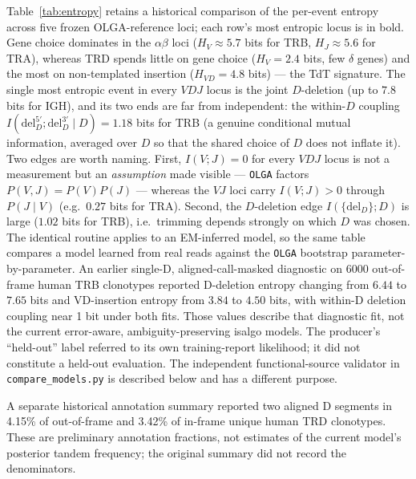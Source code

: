 \documentclass[11pt]{article}
\theoremstyle{oldplain}
\theoremstyle{oldrem}
\newcommand{\del}{\mathrm{del}}
\begin{document}
Table~\ref{tab:entropy} retains a historical comparison of the per-event entropy across five frozen OLGA-reference loci; each row's most entropic
locus is in bold. Gene choice dominates in the $\alpha\beta$ loci ($H_V\!\approx\!5.7$
bits for TRB, $H_J\!\approx\!5.6$ for TRA), whereas TRD spends little on gene choice ($H_V\!=\!2.4$ bits,
few $\delta$ genes) and the most on non-templated insertion ($H_{VD}\!=\!4.8$ bits) --- the TdT signature.
The single most entropic event in every $VDJ$ locus is the joint $D$-deletion (up to $7.8$ bits for IGH),
and its two ends are far from independent: the within-$D$ coupling $I(\del_D^{5'};\del_D^{3'}\!\mid\!D)=1.18$
bits for TRB (a genuine conditional mutual information, averaged over $D$ so that the shared choice of $D$
does not inflate it). Two edges are worth naming. First, $I(V;J)=0$ for every $VDJ$ locus is not a
measurement but an \emph{assumption} made visible --- \texttt{OLGA} factors $P(V,J)=P(V)P(J)$ --- whereas
the $VJ$ loci carry $I(V;J)>0$ through $P(J\mid V)$ (e.g.\ $0.27$ bits for TRA). Second, the $D$-deletion
edge $I(\{\del_D\};D)$ is large
($1.02$ bits for TRB), i.e.\ trimming depends strongly on which $D$ was chosen. The identical routine
applies to an EM-inferred model, so the same table compares a model learned from real reads against the
\texttt{OLGA} bootstrap parameter-by-parameter. An earlier single-D, aligned-call-masked diagnostic on 6000 out-of-frame human
TRB clonotypes reported D-deletion entropy changing from $6.44$ to $7.65$ bits
and VD-insertion entropy from $3.84$ to $4.50$ bits, with within-D deletion
coupling near 1 bit under both fits.
Those values describe that diagnostic fit, not the current error-aware,
ambiguity-preserving isalgo models.
The producer's ``held-out'' label referred to its own training-report likelihood;
it did not constitute a held-out evaluation.
The independent functional-source validator in \texttt{compare\_models.py}
is described below and has a different purpose.

A separate historical annotation summary reported two aligned D segments in
4.15\% of out-of-frame and 3.42\% of in-frame unique human TRD clonotypes.
These are preliminary annotation fractions, not estimates of the current model's
posterior tandem frequency; the original summary did not record the denominators.
\end{document}
